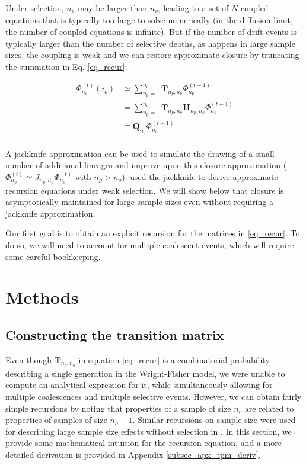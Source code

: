 \documentclass[review]{elsarticle}
\newcommand{\afs}[2]{\Phi_{#1}^{(#2)}}
\begin{document}
Under selection, $n_{p}$ may be larger than $n_o$, leading to a set of $N$ coupled equations that is
typically too large to solve numerically (in the diffusion limit, the number of coupled equations is
infinite). But if the number of drift events is typically larger than the number of selective
deaths, as happens in large sample sizes, the coupling is weak and we can restore approximate
closure by truncating the summation in Eq. \ref{eq_recur}:

\begin{equation}
\begin{split}
  \afs{n_o}{t}(i_o)
  &\simeq \sum_{n_p=1}^{n_{o}} \mathbf{T}_{n_p,n_o}                      \afs{n_p}{t-1}\\
  &=      \sum_{n_p=1}^{n_{o}} \mathbf{T}_{n_p,n_o} \mathbf{H}_{n_p,n_o} \afs{n_o}{t-1}\\
  &\equiv \mathbf{Q}_{n_o}                                               \afs{n_o}{t-1}\\
\end{split}
\label{eq_truncated}
\end{equation}

A jackknife approximation \citep{Gravel2016} can be used to simulate the drawing of a small number
of additional lineages and improve upon this closure approximation
($\afs{n_p}{t} \simeq J_{n_p,n_o} \afs{n_o}{t}$ with $n_p>n_o$). \cite{JouganousEtAl2017} used the
jackknife to derive approximate recursion equations under weak selection. We will show below that
closure is asymptotically maintained for large sample sizes even without requiring a jackknife
approximation.

Our first goal is to obtain an explicit recursion for the matrices in \eqref{eq_recur}. To do so, we
will need to account for multiple coalescent events, which will require some careful bookkeeping.

\section{Methods}
\label{sec_methods}

\subsection{Constructing the transition matrix}
\label{subsec_trans_mat}

Even though $\mathbf{T}_{n_p,n_o}$ in equation \ref{eq_recur} is a combinatorial probability
describing a single generation in the Wright-Fisher model, we were unable to compute an analytical
expression for it, while simultaneously allowing for multiple coalescences and multiple selective events. 
However,
we can obtain fairly simple recursions by noting that properties of a sample of size $n_o$ are
related to properties of samples of size $n_o-1.$ Similar recursions on sample size were used for
describing large sample size effects without selection in \citep{BhaskarEtAl2014}. In this section,
we provide some mathematical intuition for the recursion equation, and a more detailed derivation is provided in
Appendix \ref{subsec_apx_tpm_deriv}.
\end{document}
